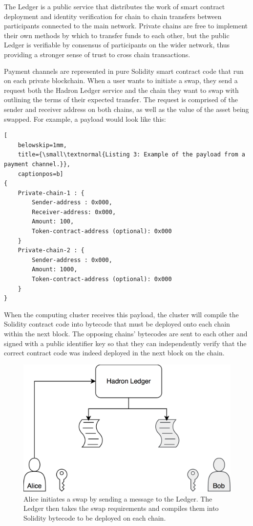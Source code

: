 \documentclass{%
	article}
\begin{document}
The Ledger is a public service that distributes the work of smart contract deployment and identity verification for chain to chain transfers between participants connected to the main network. Private chains are free to implement their own methods by which to transfer funds to each other, but the public Ledger is verifiable by consensus of participants on the wider network\cite{raftconsensus}, thus providing a stronger sense of trust to cross chain transactions.

Payment channels are represented in pure Solidity smart contract code that run on each private blockchain. When a user wants to initiate a swap, they send a request both the Hadron Ledger service and the chain they want to swap with outlining the terms of their expected transfer. The request is comprised of the sender and receiver address on both chains, as well as the value of the asset being swapped. For example, a payload would look like this:

\begin{lstlisting}[
	belowskip=1mm,
	title={\small\textnormal{Listing 3: Example of the payload from a payment channel.}},
	captionpos=b]
{
    Private-chain-1 : {
        Sender-address : 0x000,
        Receiver-address: 0x000,
        Amount: 100,
        Token-contract-address (optional): 0x000
    }
    Private-chain-2 : {
        Sender-address : 0x000,
        Amount: 1000,
        Token-contract-address (optional): 0x000
    }
}
\end{lstlisting}

When the computing cluster receives this payload, the cluster will compile the Solidity contract code into bytecode that must be deployed onto each chain within the next block. The opposing chains’ bytecodes are sent to each other and signed with a public identifier key so that they can independently verify that the correct contract code was indeed deployed in the next block on the chain.

\begin{figure}[H]
\centering
\includegraphics[scale=0.112]{fig1.png}
\caption{\small\textnormal{Alice initiates a swap by sending a message to the Ledger. The Ledger then takes the swap requirements and compiles them into Solidity bytecode to be deployed on each chain.}}
\end{figure}
\end{document}
